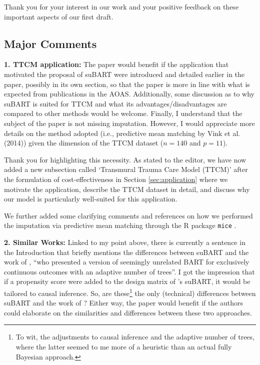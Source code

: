 \documentclass{article}
\begin{document}
Thank you for your interest in our work and your positive feedback on these important aspects of our first draft.

\subsection{Major Comments}

\begin{mdframed}
   \textbf{1. TTCM application:} The paper would benefit if the application that motivated the
proposal of suBART were introduced and detailed earlier in the paper, possibly in its own
section, so that the paper is more in line with what is expected from publications in the
AOAS. Additionally, some discussion as to why suBART is suited for TTCM and what
its advantages/disadvantages are compared to other methods would be welcome. Finally,
I understand that the subject of the paper is not missing imputation. However, I would
appreciate more details on the method adopted (i.e., predictive mean matching by Vink
et al. (2014)) given the dimension of the TTCM dataset ($n = 140$ and $p = 11$).
\end{mdframed}

Thank you for highlighting this necessity. As stated to the editor, we have now added a new subsection called `Transmural Trauma Care Model (TTCM)' after the formulation of cost-effectiveness in Section \ref{sec:application} where we motivate the application, describe the TTCM dataset in detail, and discuss why our model is particularly well-suited for this application.

We further added some clarifying comments and references on how we performed the imputation via predictive mean matching through the \textsf{R} package \texttt{mice} \citep{van2011mice}.

\begin{mdframed}
  \textbf{2. Similar Works:} Linked to my point above, there is currently a sentence in the Introduction that briefly mentions the differences between suBART and the work of \citet{chakraborty2016bayesian}, ``who presented a version of seemingly unrelated BART for exclusively continuous outcomes with an adaptive number of trees''. I got the impression that if a propensity score were added to the design matrix of \citet{chakraborty2016bayesian}'s suBART, it would be tailored to causal inference. So, are these\footnote{To wit, the adjustments to causal inference and the adaptive number of trees, where the latter seemed to me more of a heuristic than an actual fully Bayesian approach.} the only (technical) differences between suBART and the work of \citet{chakraborty2016bayesian}? Either way, the paper would benefit if the authors could elaborate on the similarities and differences between these two approaches.
\end{mdframed}
\end{document}
